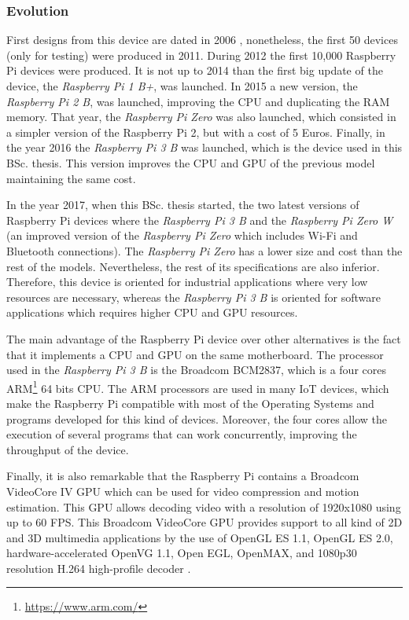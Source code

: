 \subsubsection{Evolution}
First designs from this device are dated in 2006 \cite{Upt11}, nonetheless, the first 50 devices (only for testing) were produced in 2011. During 2012 the first 10,000 Raspberry Pi devices were produced. It is not up to 2014 than the first big update of the device, the \textit{Raspberry Pi 1 B+}, was launched. In 2015 a new version, the \textit{Raspberry Pi 2 B}, was launched, improving the \ac{CPU} and duplicating the RAM memory. That year, the \textit{Raspberry Pi Zero} was also launched, which consisted in a simpler version of the Raspberry Pi 2, but with a cost of 5 Euros. Finally, in the year 2016 the \textit{Raspberry Pi 3 B} was launched, which is the device used in this \ac{BSc.} thesis. This version improves the \ac{CPU} and \ac{GPU} of the previous model maintaining the same cost.  

In the year 2017, when this \ac{BSc.} thesis started, the two latest versions of Raspberry Pi devices where the \textit{Raspberry Pi 3 B} and the \textit{Raspberry Pi Zero W} (an improved version of the \textit{Raspberry Pi Zero} which includes Wi-Fi and Bluetooth connections). The \textit{Raspberry Pi Zero} has a lower size and cost than the rest of the models. Nevertheless, the rest of its specifications are also inferior. Therefore, this device is oriented for industrial applications where very low resources are necessary, whereas the \textit{Raspberry Pi 3 B} is oriented for software applications which requires higher CPU and GPU resources.

The main advantage of the Raspberry Pi device over other alternatives is the fact that it implements a \ac{CPU} and \ac{GPU} on the same motherboard. The processor used in the \textit{Raspberry Pi 3 B} is the Broadcom BCM2837, which is a four cores ARM\footnote{\url{https://www.arm.com/}} 64 bits \ac{CPU}. The ARM processors are used in many \ac{IoT} devices, which make the Raspberry Pi compatible with most of the Operating Systems and programs developed for this kind of devices. Moreover, the four cores allow the execution of several programs that can work concurrently, improving the throughput of the device.

Finally, it is also remarkable that the Raspberry Pi contains a Broadcom VideoCore IV \ac{GPU} which can be used for video compression and motion estimation. This \ac{GPU} allows decoding video with a resolution of 1920x1080 using up to 60 \ac{FPS}. This Broadcom VideoCore \ac{GPU} provides support to all kind of 2D and 3D multimedia applications by the use of OpenGL ES 1.1, OpenGL ES 2.0, hardware-accelerated OpenVG 1.1, Open EGL, OpenMAX, and 1080p30 resolution H.264 high-profile decoder \cite{VideoCoreIV}.


